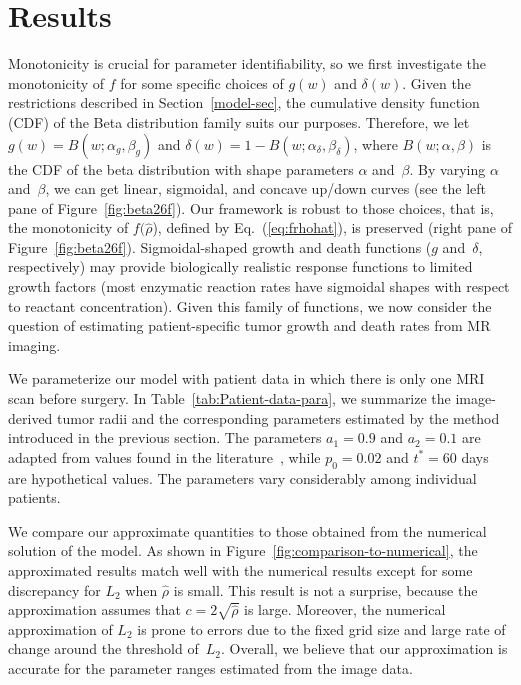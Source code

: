\documentclass{aims}
\numberwithin{equation}{section}
\begin{document}
\section{Results}

Monotonicity is crucial for parameter identifiability, so we
first investigate the monotonicity of $f$ for some specific
choices of $g(w)$ and $\delta(w)$.
Given the restrictions described in Section~\ref{model-sec},
the cumulative density function (CDF) of the Beta distribution family
suits our purposes.  Therefore, we let $g(w)=B(w;\alpha_g,\beta_g)$ and
$\delta(w)=1-B(w;\alpha_{\delta},\beta_{\delta})$, where 
$B(w; \alpha, \beta)$ is the CDF of the beta distribution with shape
parameters $\alpha$ and~$\beta$. By varying $\alpha$ and~$\beta$, we can
get linear, sigmoidal, and concave
up/down curves (see the left pane of Figure~\ref{fig:beta26f}).
Our framework is robust to those choices, that is, the
monotonicity of $f(\hat\rho$), defined by Eq.~(\ref{eq:frhohat}),
is preserved (right pane of Figure~\ref{fig:beta26f}). 
Sigmoidal-shaped growth and death functions ($g$ and~$\delta$, respectively)
may provide biologically realistic response functions to limited growth factors
(most enzymatic reaction rates have sigmoidal
shapes with respect to reactant concentration).  Given this family of
functions, we now consider the question of estimating patient-specific tumor
growth and death rates from MR imaging.

We parameterize our model with patient data in which there is only
one MRI scan before surgery. In Table~\ref{tab:Patient-data-para},
we summarize the image-derived tumor radii and the corresponding parameters
estimated by the method introduced in the previous section.
The parameters $a_1=0.9$ and $a_2=0.1$ are adapted from values found in the
literature~\cite{Swanson2008}, while $p_0=0.02$  and $t^*=60$ days
are hypothetical values.  The parameters vary considerably
among individual patients. 

We compare our approximate quantities to those obtained from the numerical
solution of the model.  As shown in Figure~\ref{fig:comparison-to-numerical},
the approximated results match well with the numerical results except
for some discrepancy for $L_{2}$ when $\hat{\rho}$ is small.  This result
is not a surprise, because the approximation assumes that
$c=2\sqrt{\hat{\rho}}$ is large.  Moreover, the numerical approximation
of $L_{2}$ is prone to errors due to the fixed grid size and large
rate of change around the threshold of~$L_{2}$. Overall, we believe
that our approximation is accurate for the parameter ranges estimated
from the image data.
\end{document}
